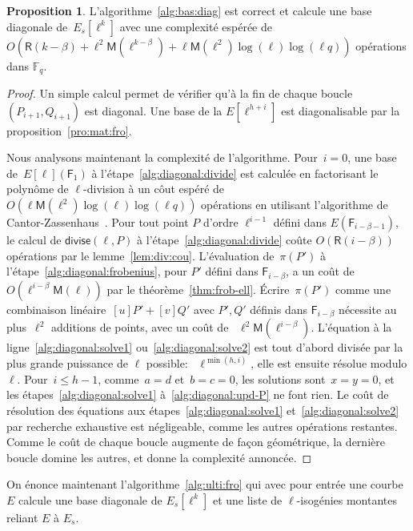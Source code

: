 \documentclass[10pt,a4paper]{book}
\theoremstyle{plain}
\theoremstyle{definition}
\theoremstyle{definition}
\theoremstyle{definition}
\theoremstyle{definition}
\newtheorem{prop}[thm]{Proposition}
\theoremstyle{definition}
\theoremstyle{remark}
\theoremstyle{remark}
\theoremstyle{definition}
\begin{document}
\begin{prop}\label{pro:alg:diagonal}
L'algorithme~\ref{alg:bas:diag} est correct et calcule une base diagonale 
de~$E_s[\ell^k]$ avec une complexité espérée de
$O(\mathsf{R}(k-\beta) + \ell^2\mathsf{M}(\ell^{k-\beta}) + \ell\mathsf{M}(\ell^2)\log(\ell)\log(\ell q))$ 
opérations dans $\mathbb{F}_q$.
\end{prop}

\begin{proof}
Un simple calcul permet de vérifier qu'à la fin de chaque boucle
$(P_{i+1},Q_{i+1})$ est diagonal. Une base de la $E[\ell^{h+i}]$ est 
diagonalisable par la proposition~\ref{pro:mat:fro}.

Nous analysons maintenant la complexité de l'algorithme.
Pour~$i = 0$, une base de~$E[\ell](\mathsf{F}_1)$ à l'étape~\ref{alg:diagonal:divide}
est calculée en factorisant le polynôme de $\ell$-division
à un côut espéré de $O(\ell\mathsf{M}(\ell^2)\log(\ell)\log(\ell q))$
opérations en utilisant l'algorithme de Cantor-Zassenhaus~\cite[Chapter 14.5]{vzGJG03}.
  Pour tout point $P$ d'ordre $\ell^{i-1}$ défini dans $E(\mathsf{F}_{i-\beta-1})$, 
  le calcul de $\mathsf{divise}(\ell, P)$ à l'étape~\ref{alg:diagonal:divide}
  coûte $O(\mathsf{R}(i-\beta))$ opérations par le lemme~\ref{lem:div:cou}.
  L'évaluation de~$\pi(P')$ à l'étape~\ref{alg:diagonal:frobenius}, pour $P'$ 
  défini dans $\mathsf{F}_{i-\beta}$, a un coût
  de~$O(\ell^{i-\beta}\mathsf{M}(\ell))$ par le théorème~\ref{thm:frob-ell}.
  \'Ecrire~$\pi(P')$ comme une combinaison linéaire~$[u] P' + [v] Q'$ avec 
  $P',Q'$ définis dans $\mathsf{F}_{i-\beta}$ nécessite au
  plus~$\ell^2$ additions de points, avec un coût de ~$\ell^2
  \mathsf{M}(\ell^{i-\beta})$.
L'équation à la ligne~\ref{alg:diagonal:solve1} ou~\ref{alg:diagonal:solve2}
est tout d'abord divisée par la plus grande puissance de $\ell$ possible:
~$\ell^{\min (h, i)}$, elle est ensuite résolue modulo $\ell$.
Pour~$i \leqslant h-1$, comme~$a = d$ et~$b = c = 0$, les solutions sont~$x = y
 = 0$, et les étapes~\ref{alg:diagonal:solve1} à~\ref{alg:diagonal:upd-P} ne 
font rien.
  Le coût de résolution des équations aux étapes~\ref{alg:diagonal:solve1}
  et~\ref{alg:diagonal:solve2} par recherche exhaustive est négligeable, comme
  les autres opérations restantes. Comme le coût de chaque boucle augmente
  de façon géométrique, la dernière boucle domine les autres, et donne la
  complexité annoncée.
\end{proof}

On énonce maintenant l'algorithme~\ref{alg:ulti:fro} qui avec pour entrée une 
courbe $E$ calcule une base diagonale de $E_s[\ell^k]$ et une liste de 
$\ell$-isogénies montantes reliant $E$ à $E_s$.
\end{document}
